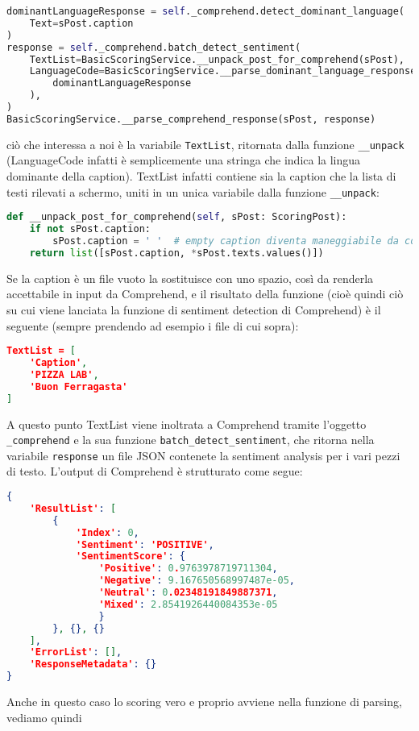 \begin{lstlisting}[language=Python]
dominantLanguageResponse = self._comprehend.detect_dominant_language(
    Text=sPost.caption
)
response = self._comprehend.batch_detect_sentiment(
    TextList=BasicScoringService.__unpack_post_for_comprehend(sPost),
    LanguageCode=BasicScoringService.__parse_dominant_language_response(
        dominantLanguageResponse
    ),
)
BasicScoringService.__parse_comprehend_response(sPost, response)
\end{lstlisting}
ciò che interessa a noi è la variabile \verb+TextList+, ritornata dalla funzione \verb+__unpack+ 
(LanguageCode infatti è semplicemente una stringa che indica la lingua dominante della caption).
TextList infatti contiene sia la caption che la lista di testi rilevati a schermo, uniti in un
unica variabile dalla funzione \verb+__unpack+:
\begin{lstlisting}[language=Python]
def __unpack_post_for_comprehend(self, sPost: ScoringPost):
    if not sPost.caption:
        sPost.caption = ' '  # empty caption diventa maneggiabile da comprehend
    return list([sPost.caption, *sPost.texts.values()])
\end{lstlisting}
Se la caption è un file vuoto la sostituisce con uno spazio, così da renderla accettabile in input
da Comprehend, e il risultato della funzione (cioè quindi ciò su cui viene lanciata la funzione di
sentiment detection di Comprehend) è il seguente (sempre prendendo ad esempio i file di cui sopra):
\begin{lstlisting}[language=JSON]
TextList = [
    'Caption',
    'PIZZA LAB',
    'Buon Ferragasta'
]
\end{lstlisting}
A questo punto TextList viene inoltrata a Comprehend tramite l'oggetto \verb+_comprehend+ e la sua
funzione \verb+batch_detect_sentiment+, che ritorna nella variabile \verb+response+ un file JSON
contenete la sentiment analysis per i vari pezzi di testo. 
L'output di Comprehend è strutturato come segue:
\begin{lstlisting}[language=JSON]
{
    'ResultList': [
        {
            'Index': 0, 
            'Sentiment': 'POSITIVE', 
            'SentimentScore': {
                'Positive': 0.9763978719711304, 
                'Negative': 9.167650568997487e-05, 
                'Neutral': 0.02348191849887371, 
                'Mixed': 2.8541926440084353e-05
                }
        }, {}, {}
    ], 
    'ErrorList': [], 
    'ResponseMetadata': {}
}
\end{lstlisting}
Anche in questo caso lo scoring vero e proprio avviene nella funzione di parsing, vediamo quindi
